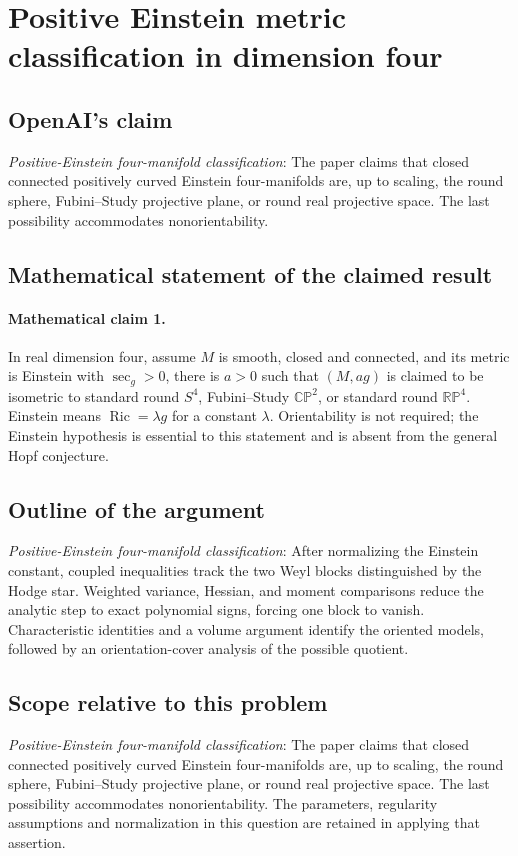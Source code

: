 \documentclass[11pt]{article}
\begin{document}
\section*{Positive Einstein metric classification in dimension four}

\subsection{OpenAI's claim}
\textit{Positive-Einstein four-manifold classification}: The paper claims that closed connected positively curved Einstein four-manifolds are, up to scaling, the round sphere, Fubini--Study projective plane, or round real projective space. The last possibility accommodates nonorientability.

\subsection{Mathematical statement of the claimed result}
\paragraph{Mathematical claim 1.} In real dimension four, assume $M$ is smooth, closed and connected, and its metric is Einstein with $\sec_g>0$, there is $a>0$ such that $(M,ag)$ is claimed to be isometric to standard round $S^4$, Fubini--Study $\mathbb{CP}^2$, or standard round $\mathbb{RP}^4$. Einstein means $\operatorname{Ric}=\lambda g$ for a constant $\lambda$. Orientability is not required; the Einstein hypothesis is essential to this statement and is absent from the general Hopf conjecture.

\subsection{Outline of the argument}
\textit{Positive-Einstein four-manifold classification}: After normalizing the Einstein constant, coupled inequalities track the two Weyl blocks distinguished by the Hodge star. Weighted variance, Hessian, and moment comparisons reduce the analytic step to exact polynomial signs, forcing one block to vanish. Characteristic identities and a volume argument identify the oriented models, followed by an orientation-cover analysis of the possible quotient.

\subsection{Scope relative to this problem}
\textit{Positive-Einstein four-manifold classification}: The paper claims that closed connected positively curved Einstein four-manifolds are, up to scaling, the round sphere, Fubini--Study projective plane, or round real projective space. The last possibility accommodates nonorientability. The parameters, regularity assumptions and normalization in this question are retained in applying that assertion.
\end{document}
